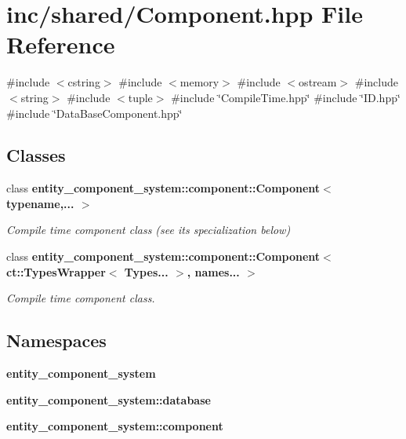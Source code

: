 \section{inc/shared/\+Component.hpp File Reference}
\label{_component_8hpp}
{\ttfamily \#include $<$cstring$>$}\newline
{\ttfamily \#include $<$memory$>$}\newline
{\ttfamily \#include $<$ostream$>$}\newline
{\ttfamily \#include $<$string$>$}\newline
{\ttfamily \#include $<$tuple$>$}\newline
{\ttfamily \#include \char`\"{}Compile\+Time.\+hpp\char`\"{}}\newline
{\ttfamily \#include \char`\"{}I\+D.\+hpp\char`\"{}}\newline
{\ttfamily \#include \char`\"{}Data\+Base\+Component.\+hpp\char`\"{}}\newline
\subsection*{Classes}
\begin{DoxyCompactItemize}
\item 
class {\bf entity\+\_\+component\+\_\+system\+::component\+::\+Component$<$ typename,... $>$}
\begin{DoxyCompactList}\small\item\em Compile time component class (see its specialization below) \end{DoxyCompactList}\item 
class {\bf entity\+\_\+component\+\_\+system\+::component\+::\+Component$<$ ct\+::\+Types\+Wrapper$<$ Types... $>$, names... $>$}
\begin{DoxyCompactList}\small\item\em Compile time component class. \end{DoxyCompactList}\end{DoxyCompactItemize}
\subsection*{Namespaces}
\begin{DoxyCompactItemize}
\item 
 {\bf entity\+\_\+component\+\_\+system}
\item 
 {\bf entity\+\_\+component\+\_\+system\+::database}
\item 
 {\bf entity\+\_\+component\+\_\+system\+::component}
\end{DoxyCompactItemize}

